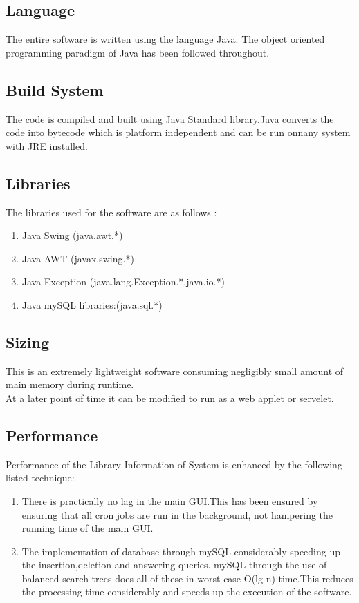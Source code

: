 \documentclass{article}
\begin{document}
\subsection{Language}
The entire software is written using the language Java.
The object oriented programming paradigm of Java has been followed throughout.
\subsection{Build System}
The code is compiled and built using Java Standard library.Java converts the code into bytecode which is platform independent and can be run onnany system with JRE installed.

\subsection{Libraries}
The libraries used for the software are as follows :

\begin{enumerate}
\item Java Swing (java.awt.*)
\item Java AWT   (javax.swing.*)
\item Java Exception  (java.lang.Exception.*,java.io.*)
\item Java mySQL libraries:(java.sql.*)
\end{enumerate}
\subsection{Sizing}
This is an extremely lightweight software consuming negligibly small amount of main memory during runtime.\\ 
At a later point of time it can be modified to run as a web applet or servelet. 

\subsection{Performance}
Performance of the Library Information of System is enhanced by the following listed technique:
\begin{enumerate}
\item There is practically no lag in the main GUI.This has been ensured by 
ensuring that all cron jobs are run in the background, not hampering the running time of the main GUI.
\item The implementation of database through mySQL considerably speeding up the insertion,deletion and answering queries. mySQL through the use of balanced search trees does all of these in worst case O(lg n) time.This reduces the processing time considerably and speeds up the execution of the software. 

\end{enumerate}
\end{document}
